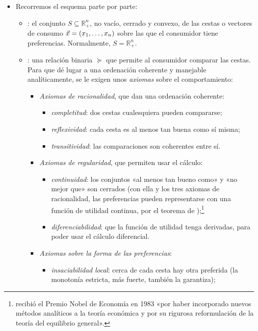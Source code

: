 \documentclass[11pt]{article}
\begin{document}
\begin{itemize}
\item Recorremos el esquema parte por parte:
  \begin{itemize}
  \item {}: el conjunto $S\subseteq\mathbb{R}^n_+$, no vacío, cerrado y convexo, de las cestas o vectores de consumo $\vec{x}=(x_1,\dots,x_n)$ sobre las que el consumidor tiene preferencias. Normalmente, $S=\mathbb{R}^n_+$.
  \item {}: una relación binaria $\succcurlyeq$ que permite al consumidor comparar las cestas. Para que dé lugar a una ordenación coherente y manejable analíticamente, se le exigen unos \emph{axiomas} sobre el comportamiento:
    \begin{itemize}
    \item \emph{Axiomas de racionalidad}, que dan una ordenación coherente:
      \begin{itemize}
      \item \emph{completitud}: dos cestas cualesquiera pueden compararse;
      \item \emph{reflexividad}: cada cesta es al menos tan buena como sí misma;
      \item \emph{transitividad}: las comparaciones son coherentes entre sí.
      \end{itemize}
    \item \emph{Axiomas de regularidad}, que permiten usar el cálculo:
      \begin{itemize}
      \item \emph{continuidad}: los conjuntos «al menos tan bueno como» y «no mejor que» son cerrados (con ella y los tres axiomas de racionalidad, las preferencias pueden representarse con una función de utilidad continua, por el teorema de );\footnote{ recibió el Premio Nobel de Economía en 1983 «por haber incorporado nuevos métodos analíticos a la teoría económica y por su rigurosa reformulación de la teoría del equilibrio general»\nocite{Nobel1983Debreu}.}
      \item \emph{diferenciabilidad}: que la función de utilidad tenga derivadas, para poder usar el cálculo diferencial.
      \end{itemize}
    \item \emph{Axiomas sobre la forma de las preferencias}:
      \begin{itemize}
      \item \emph{insaciabilidad local}: cerca de cada cesta hay otra preferida (la monotonía estricta, más fuerte, también la garantiza);

\end{itemize}
\end{itemize}
\end{itemize}
\end{itemize}
\end{document}
